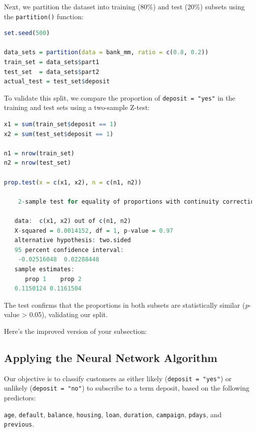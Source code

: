 \documentclass[
]{book}
\newcommand{\passthrough}[1]{#1}
\theoremstyle{definition}
\theoremstyle{definition}
\theoremstyle{definition}
\theoremstyle{definition}
\theoremstyle{remark}
\begin{document}
Next, we partition the dataset into training (80\%) and test (20\%) subsets using the \passthrough{\lstinline!partition()!} function:

\begin{lstlisting}[language=R]
set.seed(500)

data_sets = partition(data = bank_mm, ratio = c(0.8, 0.2))
train_set = data_sets$part1
test_set  = data_sets$part2
actual_test = test_set$deposit
\end{lstlisting}

To validate this split, we compare the proportion of \passthrough{\lstinline!deposit = "yes"!} in the training and test sets using a two-sample Z-test:

\begin{lstlisting}[language=R]
x1 = sum(train_set$deposit == 1)
x2 = sum(test_set$deposit == 1)

n1 = nrow(train_set)
n2 = nrow(test_set)

prop.test(x = c(x1, x2), n = c(n1, n2))
   
    2-sample test for equality of proportions with continuity correction
   
   data:  c(x1, x2) out of c(n1, n2)
   X-squared = 0.0014152, df = 1, p-value = 0.97
   alternative hypothesis: two.sided
   95 percent confidence interval:
    -0.02516048  0.02288448
   sample estimates:
      prop 1    prop 2 
   0.1150124 0.1161504
\end{lstlisting}

The test confirms that the proportions in both subsets are statistically similar (\emph{p}-value \textgreater{} 0.05), validating our split.

Here's the improved version of your subsection:

\subsection*{Applying the Neural Network Algorithm}\label{applying-the-neural-network-algorithm}

Our objective is to classify customers as either likely (\passthrough{\lstinline!deposit = "yes"!}) or unlikely (\passthrough{\lstinline!deposit = "no"!}) to subscribe to a term deposit, based on the following predictors:

\passthrough{\lstinline!age!}, \passthrough{\lstinline!default!}, \passthrough{\lstinline!balance!}, \passthrough{\lstinline!housing!}, \passthrough{\lstinline!loan!}, \passthrough{\lstinline!duration!}, \passthrough{\lstinline!campaign!}, \passthrough{\lstinline!pdays!}, and \passthrough{\lstinline!previous!}.
\end{document}
